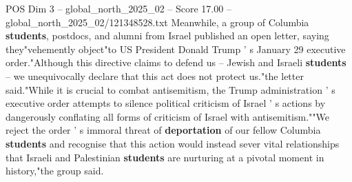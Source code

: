 \begin{textsample}{POS Dim 3 – global\_north\_2025\_02 – Score 17.00 – global\_north\_2025\_02/121348528.txt}
Meanwhile, a group of Columbia \textbf{students}, postdocs, and alumni from Israel published an open letter, saying they"vehemently object"to US President Donald Trump ' s January 29 executive order."Although this directive claims to defend us -- Jewish and Israeli \textbf{students} -- we unequivocally declare that this act does not protect us."the letter said."While it is crucial to combat antisemitism, the Trump administration ' s executive order attempts to silence political criticism of Israel ' s actions by dangerously conflating all forms of criticism of Israel with antisemitism.""We reject the order ' s immoral threat of \textbf{deportation} of our fellow Columbia \textbf{students} and recognise that this action would instead sever vital relationships that Israeli and Palestinian \textbf{students} are nurturing at a pivotal moment in history,"the group said.

\end{textsample}
